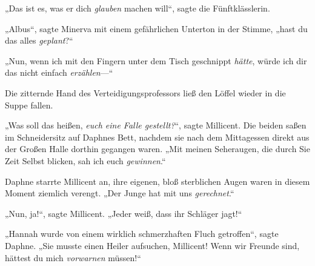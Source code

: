 „Das ist es, was er dich \emph{glauben} machen will“, sagte die Fünftklässlerin.

\later

„Albus“, sagte Minerva mit einem gefährlichen Unterton in der Stimme, „hast du das alles \emph{geplant}?“

\later

„Nun, wenn ich mit den Fingern unter dem Tisch geschnippt \emph{hätte}, würde ich dir das nicht einfach \emph{erzählen}—“

\later

Die zitternde Hand des Verteidigungsprofessors ließ den Löffel wieder in die Suppe fallen.

\later

„Was soll das heißen, \emph{euch eine Falle gestellt?}“, sagte Millicent. Die beiden saßen im Schneidersitz auf Daphnes Bett, nachdem sie nach dem Mittagessen direkt aus der Großen Halle dorthin gegangen waren. „Mit meinen Seheraugen, die durch Sie Zeit Selbst blicken, sah ich euch \emph{gewinnen}.“

Daphne starrte Millicent an, ihre eigenen, bloß sterblichen Augen waren in diesem Moment ziemlich verengt. „Der Junge hat mit uns \emph{gerechnet}.“

„Nun, ja!“, sagte Millicent. „Jeder weiß, dass ihr Schläger jagt!“

„Hannah wurde von einem wirklich schmerzhaften Fluch getroffen“, sagte Daphne. „Sie musste einen Heiler aufsuchen, Millicent! Wenn wir Freunde sind, hättest du mich \emph{vorwarnen} müssen!“

